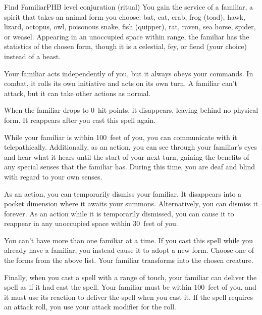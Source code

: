 \begin{spell}{Find Familiar}{PHB}{ level conjuration (ritual)}
{
}
You gain the service of a familiar, a spirit that takes an
animal form you choose: bat, cat, crab, frog (toad), hawk,
lizard, octopus, owl, poisonous snake, fish (quipper),
rat, raven, sea horse, spider, or weasel. Appearing in
an unoccupied space within range, the familiar has the
statistics of the chosen form, though it is a celestial, fey,
or fiend (your choice) instead of a beast.

Your familiar acts independently of you, but it always
obeys your commands. In combat, it rolls its own
initiative and acts on its own turn. A familiar can't
attack, but it can take other actions as normal.

When the familiar drops to 0~hit points, it disappears,
leaving behind no physical form. It reappears after you
cast this spell again.

While your familiar is within 100~feet of you, you
can communicate with it telepathically. Additionally,
as an action, you can see through your familiar's eyes
and hear what it hears until the start of your next turn,
gaining the benefits of any special senses that the
familiar has. During this time, you are deaf and blind
with regard to your own senses.

As an action, you can temporarily dismiss your
familiar. It disappears into a pocket dimension where it
awaits your summons. Alternatively, you can dismiss it
forever. As an action while it is temporarily dismissed,
you can cause it to reappear in any unoccupied space
within 30~feet of you.

You can't have more than one familiar at a time. If you
cast this spell while you already have a familiar, you
instead cause it to adopt a new form. Choose one of the
forms from the above list. Your familiar transforms into
the chosen creature.

Finally, when you cast a spell with a range of touch,
your familiar can deliver the spell as if it had cast the
spell. Your familiar must be within 100~feet of you, and
it must use its reaction to deliver the spell when you cast
it. If the spell requires an attack roll, you use your attack
modifier for the roll.
\end{spell}
